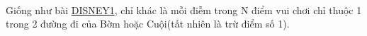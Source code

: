  

Giống như bài \href{http://vnoi.info/problems/show/DISNEY1/}{DISNEY1}, chỉ khác là mỗi điễm trong N điểm vui chơi chỉ thuộc 1 trong 2 đường đi của Bờm hoặc Cuội(tất nhiên là trừ điểm số 1).